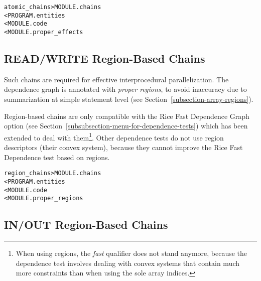 \documentclass[a4paper]{report}
\newenvironment{PipsMake}{\begin{alltt}}{\end{alltt}}
\newenvironment{PipsPass}[1]{\label{pass:#1}}{}
\begin{document}
\begin{PipsMake}
atomic_chains                   > MODULE.chains
        < PROGRAM.entities
        < MODULE.code
        < MODULE.proper_effects
\end{PipsMake}

\subsection{READ/WRITE Region-Based Chains}

\begin{PipsPass}{region_chains}
\label{subsubsection-read-write-region-based-chains}

Such chains are required for effective interprocedural parallelization. The
dependence graph is annotated with {\em proper regions}, to avoid inaccuracy
due to summarization at simple statement level (see
Section~\ref{subsection-array-regions}).


Region-based chains are only compatible with the Rice Fast Dependence Graph
option (see Section~\ref{subsubsection-menu-for-dependence-tests})
which has been extended to deal with them\footnote{When using regions,
the {\em fast} qualifier does not stand anymore, because the dependence
test involves dealing with convex systems that contain much more
constraints than when using the sole array indices.}.  Other
dependence tests do not use region descriptors (their convex system),
because they cannot improve the Rice Fast Dependence test based on regions.

\end{PipsPass}

\begin{PipsMake}
region_chains                   > MODULE.chains
        < PROGRAM.entities
        < MODULE.code
        < MODULE.proper_regions
\end{PipsMake}

\subsection{IN/OUT Region-Based Chains}
\end{document}
